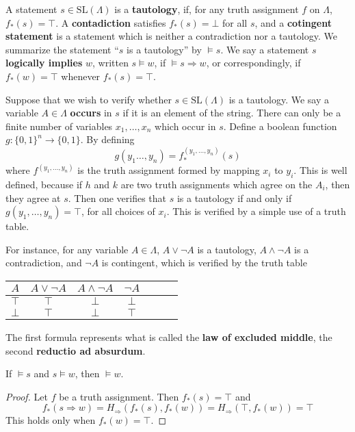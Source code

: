 \begin{definition}
    A statement $s \in \text{SL}(\Lambda)$ is a {\bf tautology}, if, for any truth assignment $f$ on $\Lambda$, $f_*(s) = \top$. A {\bf contadiction} satisfies $f_*(s) = \bot$ for all $s$, and a {\bf cotingent statement} is a statement which is neither a contradiction nor a tautology. We summarize the statement ``$s$ is a tautology'' by $\vDash s$. We say a statement $s$ {\bf logically implies} $w$, written $s \vDash w$, if $\vDash s \Rightarrow w$, or correspondingly, if $f_*(w) = \top$ whenever $f_*(s) = \top$.
\end{definition}

Suppose that we wish to verify whether $s \in \text{SL}(\Lambda)$ is a tautology. We say a variable $A \in \Lambda$ {\bf occurs} in $s$ if it is an element of the string. There can only be a finite number of variables $x_1, \dots, x_n$ which occur in $s$. Define a boolean function $g: \{ 0, 1 \}^n \to \{ 0, 1 \}$. By defining
%
\[ g(y_1 \dots, y_n) = f^{(y_1, \dots, y_n)}_*(s) \]
%
where $f^{(y_1, \dots, y_n)}$ is the truth assignment formed by mapping $x_i$ to $y_i$. This is well defined, because if $h$ and $k$ are two truth assignments which agree on the $A_i$, then they agree at $s$. Then one verifies that $s$ is a tautology if and only if $g(y_1, \dots, y_n) = \top$, for all choices of $x_i$. This is verified by a simple use of a truth table.

\begin{example}
    For instance, for any variable $A \in \Lambda$, $A \vee \neg A$ is a tautology, $A \wedge \neg A$ is a contradiction, and $\neg A$ is contingent, which is verified by the truth table
    \begin{center}
    \begin{tabular}{| c | c | c | c | c | c | c |}
        \hline $A$ & $A \vee \neg A$ & $A \wedge \neg A$ & $\neg A$ \\
        \hline $\top$ & $\top$ & $\bot$ & $\bot$ \\
               $\bot$ & $\top$ & $\bot$ & $\top$ \\
        \hline
    \end{tabular}
    \end{center}
    The first formula represents what is called the {\bf law of excluded middle}, the second {\bf reductio ad absurdum}.
\end{example}

\begin{theorem}
    If $\vDash s$ and $s \vDash w$, then $\vDash w$.
\end{theorem}
\begin{proof}
    Let $f$ be a truth assignment. Then $f_*(s) = \top$ and
    \[ f_*(s \Rightarrow w) = H_\Rightarrow(f_*(s),f_*(w)) = H_\Rightarrow(\top, f_*(w)) = \top \]
    This holds only when $f_*(w) = \top$.
\end{proof}

